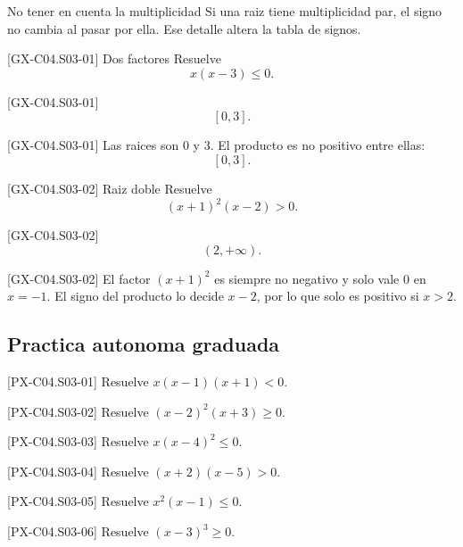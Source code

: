 \begin{commonerror}{No tener en cuenta la multiplicidad}
Si una raiz tiene multiplicidad par, el signo no cambia al pasar por ella. Ese detalle altera la
tabla de signos.
\end{commonerror}

\begin{guidedexercise}{[GX-C04.S03-01] Dos factores}
Resuelve
\[
x(x-3)\leq 0.
\]
\end{guidedexercise}

\begin{shortanswer}{[GX-C04.S03-01]}
\[
[0,3].
\]
\end{shortanswer}

\begin{fullsolution}{[GX-C04.S03-01]}
Las raices son \(0\) y \(3\). El producto es no positivo entre ellas:
\[
[0,3].
\]
\end{fullsolution}

\begin{guidedexercise}{[GX-C04.S03-02] Raiz doble}
Resuelve
\[
(x+1)^2(x-2)>0.
\]
\end{guidedexercise}

\begin{shortanswer}{[GX-C04.S03-02]}
\[
(2,+\infty).
\]
\end{shortanswer}

\begin{fullsolution}{[GX-C04.S03-02]}
El factor \((x+1)^2\) es siempre no negativo y solo vale \(0\) en \(x=-1\). El signo del
producto lo decide \(x-2\), por lo que solo es positivo si \(x>2\).
\end{fullsolution}

\subsection*{Practica autonoma graduada}
\begin{exercise}{[PX-C04.S03-01] Resuelve \(x(x-1)(x+1)<0\).}
\end{exercise}
\begin{exercise}{[PX-C04.S03-02] Resuelve \((x-2)^2(x+3)\geq 0\).}
\end{exercise}
\begin{exercise}{[PX-C04.S03-03] Resuelve \(x(x-4)^2\leq 0\).}
\end{exercise}
\begin{exercise}{[PX-C04.S03-04] Resuelve \((x+2)(x-5)>0\).}
\end{exercise}
\begin{exercise}{[PX-C04.S03-05] Resuelve \(x^2(x-1)\leq 0\).}
\end{exercise}
\begin{exercise}{[PX-C04.S03-06] Resuelve \((x-3)^3\geq 0\).}
\end{exercise}

